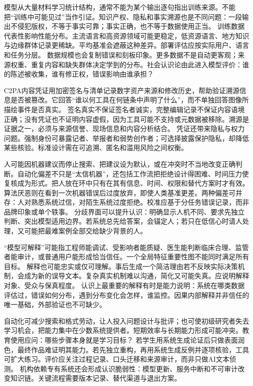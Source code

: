 模型从大量材料学习统计结构，通常不能为某个输出逐句指出训练来源。不能把“训练中可能见过”当作引证。知识产权、隐私和事实溯源也是不同问题：一段输出不侵犯版权，不等于事实可靠；事实正确，也不等于数据使用正当。 训练数据代表性影响性能分布。主流语言和高资源领域可能更稳定，低资源语言、地方知识与边缘群体记录更稀缺。平均基准会遮蔽这种差异。部署评估应按实际用户、语言和任务分层。 数据规模也会复制错误和刻板印象。更多数据不是自动更客观；来源权重、重复内容和缺失群体决定学到的分布。社会认识论由此进入模型评价：谁的陈述被收集，谁有修正权，错误影响由谁承担？

C2PA内容凭证用加密签名与清单记录数字资产来源和修改历史，帮助验证溯源信息是否被篡改\parencite{c2pa2025}。它回答“谁以何工具在何链条中声明了什么”，而不单独回答图像所描绘事件是否真实。 签名真实不保证签名者诚实，完整编辑记录不保证内容语境正确；没有凭证也不证明内容虚假，因为工具可能不支持或元数据被移除。溯源是证据之一，必须与来源信誉、现场信息和内容分析结合。 凭证还带来隐私与权力问题。强制身份可暴露记者、举报者和弱势创作者；可选择披露保护隐私，却降低某些核验。标准设计需在可追溯、匿名和滥用风险之间权衡。

人可能因机器建议而停止搜索、把建议设为默认，或在冲突时不当地改变正确判断。自动化偏差不只是“太信机器”，还包括工作流把拒绝设计得困难、时间压力使复核成为形式。把人放在环中只有在其有信息、时间、权限和替代方案时才有效。 算法厌恶则在看到一次机器错误后过度放弃，即使人类基准更差。两种偏差可并存：人对熟悉系统过信，对陌生系统过度拒绝。校准应基于分任务错误记录，而非品牌印象或单个轶事。 分歧界面可以提升认识：明确显示人机不同、要求先独立判断、突出模型适用边界。若系统总先给答案，会锚定人；若只在低信心时请人处理，又可能把最难案例全部交给缺少背景的人。

“模型可解释”可能指工程师能调试、受影响者能质疑、医生能判断临床合理、监管者能审计，或普通用户能形成恰当信任。一个全局特征重要性图不能同时满足所有目标。 解释也可能忠实或仅可理解。事后生成一个简洁理由若不反映实际决策机制，会成为新的误导文本。复杂真实机制难以沟通，简化又可能失真。应说明解释对象、受众与保真程度。 认识上最重要的解释有时是能力说明：系统在哪类数据评估过，错误如何分布，遇到分布变化会怎样，谁监控。因果内部解释并非信任的唯一基础，外部验证也不可缺少。

自动化可减少搜索和格式劳动，让人投入问题设计与批评；也可使初级研究者失去学习机会，把能力集中在少数系统提供者。短期效率与长期能力形成可能冲突。教育使用应问：哪些步骤本身就是学习目标？ 若学生用系统生成论证后只做表面润色，最终作品难证明其能力。若先独立重构，再用系统生成反例并逐项核验，工具可扩大练习。评价应关注过程记录、口头迁移和来源审计，而非只做AI文本侦测。 机构依赖专有系统还会形成认识脆弱性：模型更新、服务中断和不可审计改变知识链。关键流程需要版本记录、替代渠道与退出方案。

